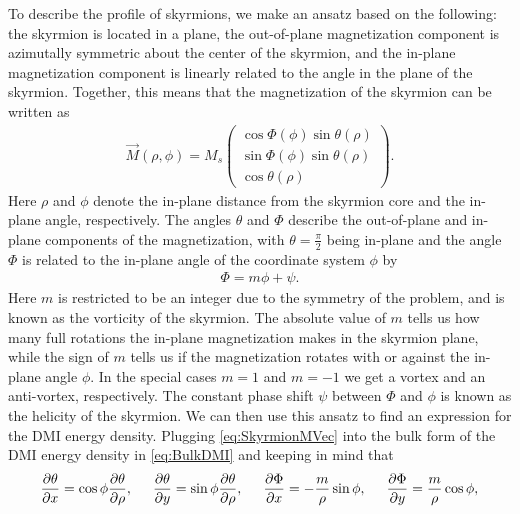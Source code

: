 \documentclass[12pt, a4paper]{article}		%
\numberwithin{equation}{section}
\begin{document}
To describe the profile of skyrmions, we make an ansatz based on the following: the skyrmion is located in a plane, the out-of-plane magnetization component is azimutally symmetric about the center of the skyrmion, and the in-plane magnetization component is linearly related to the angle in the plane of the skyrmion. Together, this means that the magnetization of the skyrmion can be written as
\begin{align}
\label{eq:SkyrmionMVec}
\vec{M}(\rho, \phi) = M_s
\begin{pmatrix}
\cos\Phi(\phi)\sin\theta(\rho) \\ \sin\Phi(\phi)\sin\theta(\rho) \\ \cos\theta(\rho)
\end{pmatrix}.
\end{align}
Here $\rho$ and $\phi$ denote the in-plane distance from the skyrmion core and the in-plane angle, respectively. The angles $\theta$ and $\Phi$ describe the out-of-plane and in-plane components of the magnetization, with $\theta = \frac{\pi}{2}$ being in-plane and the angle $\Phi$ is related to the in-plane angle of the coordinate system $\phi$ by
\begin{align}
\label{eq:SkyrmionPhi}
\Phi = m\phi + \psi.
\end{align}
Here $m$ is restricted to be an integer due to the symmetry of the problem, and is known as the vorticity of the skyrmion. The absolute value of $m$ tells us how many full rotations the in-plane magnetization makes in the skyrmion plane, while the sign of $m$ tells us if the magnetization rotates with or against the in-plane angle $\phi$. In the special cases $m=1$ and $m=-1$ we get a vortex and an anti-vortex, respectively. The constant phase shift $\psi$ between $\Phi$ and $\phi$ is known as the helicity of the skyrmion. We can then use this ansatz to find an expression for the DMI energy density. Plugging \eqref{eq:SkyrmionMVec} into the bulk form of the DMI energy density in \eqref{eq:BulkDMI} and keeping in mind that
\begin{align}
\frac{\partial \theta}{\partial x} = \cos\phi \frac{\partial\theta}{\partial\rho}, \hspace{5mm}
\frac{\partial \theta}{\partial y} = \sin\phi \frac{\partial\theta}{\partial\rho}, \hspace{5mm}
\frac{\partial \Phi}{\partial x} = -\frac{m}{\rho}\sin\phi, \hspace{5mm}
\frac{\partial \Phi}{\partial y} = \frac{m}{\rho}\cos\phi,
\end{align}
\end{document}
